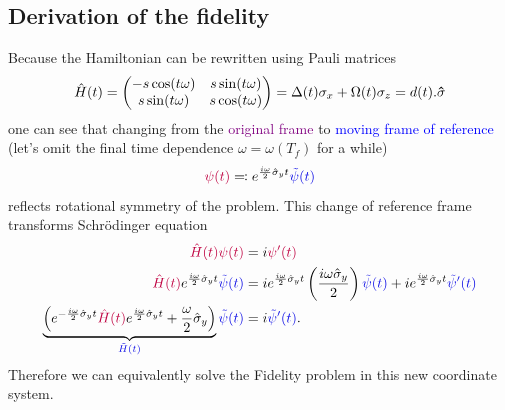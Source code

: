 \subsection{Derivation of the fidelity}
Because the Hamiltonian can be rewritten using Pauli matrices
\begin{equation}
    \hat{H}(t) = 
        \begin{pmatrix}
         -s \cos (t \omega ) & s \sin (t \omega ) \\
         s \sin (t \omega ) & s \cos (t \omega ) \\
        \end{pmatrix}
        =\Delta(t)\sigma_x+ \Omega(t)\sigma_z= d(t).\mathbf{\hat\sigma}
\end{equation}
one can see that changing from the \textcolor{purple}{original frame} to \textcolor{blue}{moving frame of reference} (let's omit the final time dependence $\omega=\omega(T_f)$ for a while) 
\begin{equation}
    \textcolor{purple}{\psi(t)} \eqqcolon \expsp \textcolor{blue}{\tilde\psi(t)}
\end{equation}
reflects rotational symmetry of the problem. This change of reference frame transforms Schr\"odinger equation
\begin{equation}
    \begin{split}
        \textcolor{purple}{\HH(t)\psi(t)} &= i\textcolor{purple}{\psi'(t)}\\
        \textcolor{purple}{\HH(t)} \expsp\textcolor{blue}{\tilde\psi(t)} &= i \expsp \left(\frac{i\omega\hat\sigma_y}{2}\right)\textcolor{blue}{\tilde\psi(t)}+i\expsp\textcolor{blue}{\tilde\psi'(t)}\\
        \underbrace{\left(\expsm \textcolor{purple}{\HH(t)}\expsp+ \frac{\omega}{2}\hat\sigma_y\right)}_{\textcolor{blue}{\tilde H(t)}}\textcolor{blue}{\tilde\psi(t)}&=i\textcolor{blue}{\tilde\psi'(t)}.
    \end{split}
\end{equation}
Therefore we can equivalently solve the Fidelity problem in this new coordinate system.

